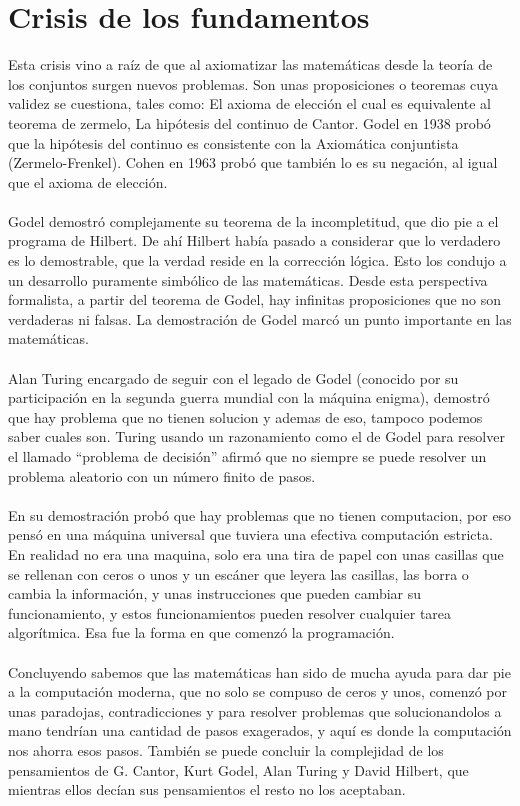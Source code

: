 \documentclass[11pt]{article}
\begin{document}
\section*{Crisis de los fundamentos}

Esta crisis vino a raíz de que al axiomatizar las matemáticas desde la teoría de los conjuntos surgen nuevos problemas. Son unas proposiciones o teoremas cuya validez se cuestiona, tales como: El axioma de elección el cual es equivalente al teorema de zermelo, La hipótesis del continuo de Cantor. Godel en 1938 probó que la hipótesis del continuo es consistente con la Axiomática conjuntista (Zermelo-Frenkel). Cohen en 1963 probó que también lo es su negación, al igual que el axioma de elección.
\\\\
Godel demostró complejamente su teorema de la incompletitud, que dio pie a el programa de Hilbert. De ahí Hilbert había pasado a considerar que lo verdadero es lo demostrable, que la verdad reside en la corrección lógica. Esto los condujo a un desarrollo puramente simbólico de las matemáticas. Desde esta perspectiva formalista, a partir del teorema de Godel, hay infinitas proposiciones que no son verdaderas ni falsas. La demostración de Godel marcó un punto importante en las matemáticas.
\\\\
%
Alan Turing encargado de seguir con el legado de Godel (conocido por su participación en la segunda guerra mundial con la máquina enigma), demostró que hay problema que no tienen solucion y ademas de eso, tampoco podemos saber cuales son. Turing usando un razonamiento como el de Godel para resolver el llamado “problema de decisión” afirmó que no siempre se puede resolver un problema aleatorio con un número finito de pasos.
\\\\
%
En su demostración probó que hay problemas que no tienen computacion, por eso pensó en una máquina universal que tuviera una efectiva computación estricta. En realidad no era una maquina, solo era una tira de papel con unas casillas que se rellenan con ceros o unos y un escáner que leyera las casillas, las borra o cambia la información, y unas instrucciones que pueden cambiar su funcionamiento, y estos funcionamientos pueden resolver cualquier tarea algorítmica. Esa fue la forma en que comenzó la programación.
\\\\
%
Concluyendo sabemos que las matemáticas han sido de mucha ayuda para dar pie a la computación moderna, que no solo se compuso de ceros y unos, comenzó por unas paradojas, contradicciones y para resolver problemas que solucionandolos a mano tendrían una cantidad de pasos exagerados, y aquí es donde la computación nos ahorra esos pasos. También se puede concluir la complejidad de los pensamientos de G. Cantor, Kurt Godel, Alan Turing y David Hilbert, que mientras ellos decían sus pensamientos el resto no los aceptaban.  
%
\end{document}

